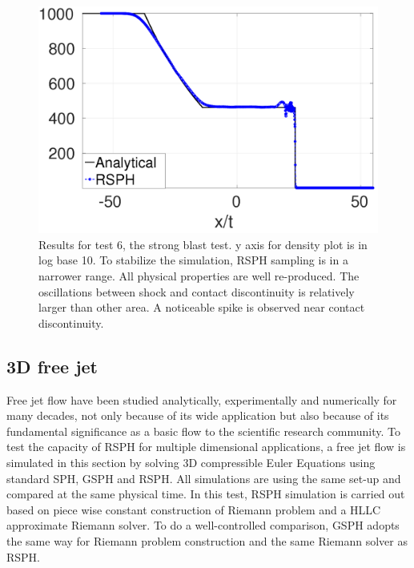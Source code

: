 \documentclass[review]{elsarticle}
\begin{document}
\begin{figure}[H]
\begin{minipage}{.415 \textwidth}
    \end{minipage}%
    \begin{minipage}{.415 \textwidth}
        \centering
        \includegraphics[width=0.99 \textwidth]{./Figures/StrBlst-RCM-p-Rp3}
    \end{minipage}%
    \caption{Results for test 6, the strong blast test. y axis for density plot is in log base 10.  To stabilize the simulation, RSPH sampling is in a narrower range. All physical properties are well re-produced. The oscillations between shock and contact discontinuity is relatively larger than other area. A noticeable spike is observed near contact discontinuity.}
    \label{fig:RCM-strong-blast}
\end{figure}

\subsection{3D free jet} \label{jet}
Free jet flow have been studied analytically, experimentally and numerically for many decades, not only because of its wide application but also because of its fundamental significance as a basic flow to the scientific research community. To test the capacity of RSPH for multiple dimensional applications, a free jet flow is simulated in this section by solving 3D compressible Euler Equations using standard SPH, GSPH and RSPH. 
All simulations are using the same set-up and compared at the same physical time. In this test, RSPH simulation is carried out based on piece wise constant construction of Riemann problem and a HLLC approximate Riemann solver. To do a well-controlled comparison, GSPH adopts the same way for Riemann problem construction and the same Riemann solver as RSPH. 
\end{document}
